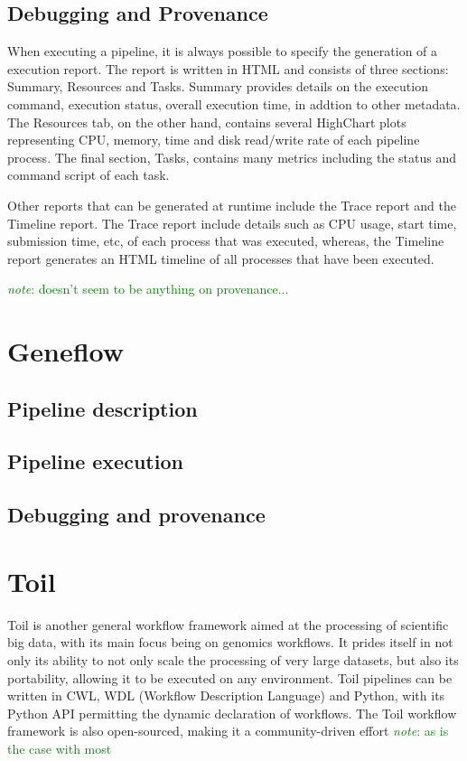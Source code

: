 \documentclass{report}
\newcommand{\note}[1]{\textcolor{green}{\textit{note}: #1}}
\begin{document}
        \subsection{Debugging and Provenance}
        When executing a pipeline, it is always possible to specify the
generation of a execution report. The report is written in HTML and consists of three sections:
Summary, Resources and Tasks. Summary provides details on the execution command,
execution status, overall execution time, in addtion to other metadata. The
Resources tab, on the other hand, contains several HighChart plots representing
CPU, memory, time and disk read/write rate of each pipeline process. The final
section, Tasks, contains many metrics including the status and command script of
each task. 

    Other reports that can be generated at runtime include the Trace report and
the Timeline report. The Trace report include details such as CPU usage, start
time, submission time, etc, of each process that was executed, whereas, the
Timeline report generates an HTML timeline of all processes that have been
executed.        

    \note{doesn't seem to be anything on provenance...}

    \section{Geneflow}
        \subsection{Pipeline description}
        \subsection{Pipeline execution}
        \subsection{Debugging and provenance}
    \section{Toil}
        Toil is another general workflow framework aimed at the processing of scientific big data, with its main focus being on
        genomics workflows. It prides itself in not only its ability to not only scale the processing of very large datasets,
        but also its portability, allowing it to be executed on any environment. Toil pipelines can be written in CWL, WDL (Workflow Description Language) and Python,
        with its Python API permitting the dynamic declaration of workflows. The Toil workflow framework is also open-sourced, making it a community-driven effort \note{as is the case with most}
\end{document}
